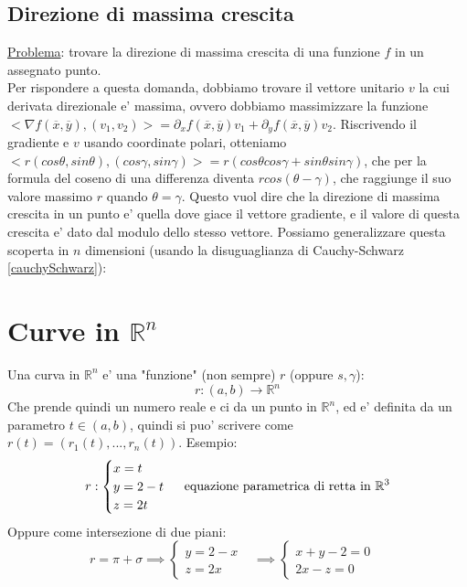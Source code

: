 \documentclass{report}
\begin{document}
\subsection{Direzione di massima crescita}
\underline{Problema}: trovare la direzione di massima crescita di una funzione $ f $ in un assegnato punto.\\
Per rispondere a questa domanda, dobbiamo trovare il vettore unitario $ v $ la cui derivata direzionale e' massima, ovvero dobbiamo massimizzare la funzione $ <\nabla f(\overline{x}, \overline{y}), (v_1,v_2)> = \partial_x f(\overline{x}, \overline{y}) v_1 + \partial_yf(\overline{x}, \overline{y}) v_2 $. Riscrivendo il gradiente e $ v $ usando coordinate polari, otteniamo $ <r(cos\theta, sin\theta), (cos\gamma, sin\gamma)> = r(cos\theta cos\gamma+sin\theta sin\gamma) $, che per la formula del coseno di una differenza diventa $ rcos(\theta - \gamma) $, che raggiunge il suo valore massimo $ r $ quando $ \theta = \gamma $. Questo vuol dire che la direzione di massima crescita in un punto e' quella dove giace il vettore gradiente, e il valore di questa crescita e' dato dal modulo dello stesso vettore. Possiamo generalizzare questa scoperta in $ n $ dimensioni (usando la disuguaglianza di Cauchy-Schwarz \ref{cauchySchwarz}):

\section{Curve in $ \mathbb{R}^n $}
Una curva in $ \mathbb{R}^n $ e' una "funzione" (non sempre) $ r $ (oppure $ s, \gamma $):
\[
  r: (a,b)\to\mathbb{R}^n
\]
Che prende quindi un numero reale e ci da un punto in $ \mathbb{R}^n $, ed e' definita da un parametro $ t \in (a,b) $, quindi si puo' scrivere come $ r(t) = (r_1(t),...,r_n(t)) $. Esempio:
\[
  r:\begin{cases}
  x=t & \\
  y=2-t & \\
  z=2t & 
  \end{cases} \text{ equazione parametrica di retta in $ \mathbb{R}^3 $}
\]
Oppure come intersezione di due piani:
\[
r = \pi + \sigma \implies \begin{cases}
y=2-x & \\
z = 2x & 
\end{cases} \implies \begin{cases}
x+y-2=0 & \\
2x-z=0 & 
\end{cases}
\]
\end{document}
